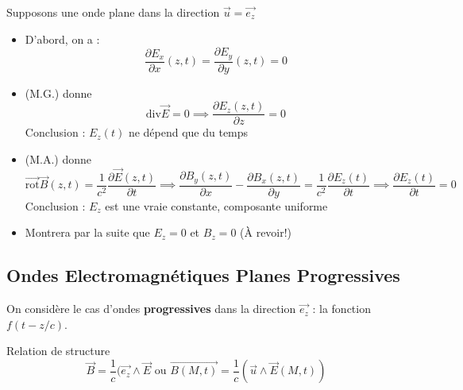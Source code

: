 \begin{myproof}
Supposons une onde plane dans la direction $\overrightarrow{u}  = \overrightarrow{e_z} $ 
\begin{itemize}
    \item D'abord, on a :
        \[
        \frac{\partial E_x}{\partial x} (z,t) = \frac{\partial E_y}{\partial y} (z,t) = 0
        \]
        
    \item (M.G.) donne 
        \[
        \mathrm{div} \overrightarrow{E}  = 0 \implies \frac{\partial E_z(z,t)}{\partial z} =0
        \]
        Conclusion : $E_z(t)$ ne dépend que du temps
    \item (M.A.) donne
        \[
          \overrightarrow{\mathrm{rot} }  \overrightarrow{B} (z,t) = \frac{1}{c^{2}}  \frac{\partial \overrightarrow{E} (z,t)}{\partial t} \implies \frac{\partial B_y(z,t)}{\partial x}  - \frac{\partial B_x(z,t)}{\partial y}  = \frac{1}{c^{2} }  \frac{\partial E_z(t)}{\partial t} \implies \frac{\partial E_z(t)}{\partial t} = 0
        \]
        Conclusion : $E_z$ est une vraie constante, composante uniforme
    \item Montrera par la suite que $E_z = 0$ et $B_z = 0$ (À revoir!)
\end{itemize}
\end{myproof}

\subsection{Ondes Electromagnétiques Planes Progressives}
On considère le cas d'ondes \textbf{progressives} dans la direction $\overrightarrow{e_z} $ : la fonction $f(t - z/c)$.

\begin{Prop}{Relation de structure}{}
\[
  \overrightarrow{B}  = \frac{1}{c} (\overrightarrow{e_z} \wedge \overrightarrow{E} \text{ ou } 
  \overrightarrow{B(M,t)}  = \frac{1}{c} (\overrightarrow{u} \wedge \overrightarrow{E}(M,t))
\]

\end{Prop}

